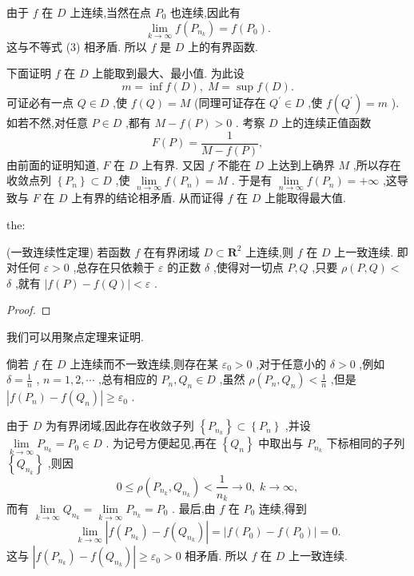 由于 \(f\) 在 \(D\) 上连续,当然在点 \({P}_{0}\) 也连续,因此有
\[
\mathop{\lim }\limits_{{k \rightarrow  \infty }}f\left( {P}_{{n}_{k}}\right)  = f\left( {P}_{0}\right) .
\]
这与不等式 (3) 相矛盾. 所以 \(f\) 是 \(D\) 上的有界函数.

下面证明 \(f\) 在 \(D\) 上能取到最大、最小值. 为此设
\[
m = \inf f\left( D\right) ,\;M = \sup f\left( D\right) .
\]
可证必有一点 \(Q \in  D\) ,使 \(f\left( Q\right)  = M\) (同理可证存在 \({Q}^{\prime } \in  D\) ,使 \(f\left( {Q}^{\prime }\right)  = m\) ). 如若不然,对任意 \(P \in  D\) ,都有 \(M - f\left( P\right)  > 0\) . 考察 \(D\) 上的连续正值函数
\[
F\left( P\right)  = \frac{1}{M - f\left( P\right) },
\]
由前面的证明知道, \(F\) 在 \(D\) 上有界. 又因 \(f\) 不能在 \(D\) 上达到上确界 \(M\) ,所以存在收敛点列 \(\left\{  {P}_{n}\right\}   \subset  D\) ,使 \(\mathop{\lim }\limits_{{n \rightarrow  \infty }}f\left( {P}_{n}\right)  = M\) . 于是有 \(\mathop{\lim }\limits_{{n \rightarrow  \infty }}f\left( {P}_{n}\right)  =  + \infty\) ,这导致与 \(F\) 在 \(D\) 上有界的结论相矛盾. 从而证得 \(f\) 在 \(D\) 上能取得最大值.

\begin{theorem}{}{the:}

\end{theorem}
(一致连续性定理) 若函数 \(f\) 在有界闭域 \(D \subset  {\mathbf{R}}^{2}\) 上连续,则 \(f\) 在 \(D\) 上一致连续. 即对任何 \(\varepsilon  > 0\) ,总存在只依赖于 \(\varepsilon\) 的正数 \(\delta\) ,使得对一切点 \(P,Q\) ,只要 \(\rho \left( {P,Q}\right)  <\)  \(\delta\) ,就有 \(\left| {f\left( P\right)  - f\left( Q\right) }\right|  < \varepsilon\) .

\begin{proof}

\end{proof}
我们可以用聚点定理来证明.

倘若 \(f\) 在 \(D\) 上连续而不一致连续,则存在某 \({\varepsilon }_{0} > 0\) ,对于任意小的 \(\delta  > 0\) ,例如 \(\delta  = \frac{1}{n}\) , \(n = 1,2,\cdots\) ,总有相应的 \({P}_{n},{Q}_{n} \in  D\) ,虽然 \(\rho \left( {{P}_{n},{Q}_{n}}\right)  < \frac{1}{n}\) ,但是 \(\left| {f\left( {P}_{n}\right)  - f\left( {Q}_{n}\right) }\right|  \geq  {\varepsilon }_{0}\) .

由于 \(D\) 为有界闭域,因此存在收敛子列 \(\left\{  {P}_{{n}_{k}}\right\}   \subset  \left\{  {P}_{n}\right\}\) ,并设 \(\mathop{\lim }\limits_{{k \rightarrow  \infty }}{P}_{{n}_{k}} = {P}_{0} \in  D\) . 为记号方便起见,再在 \(\left\{  {Q}_{n}\right\}\) 中取出与 \({P}_{{n}_{k}}\) 下标相同的子列 \(\left\{  {Q}_{{n}_{k}}\right\}\) ,则因
\[
0 \leq  \rho \left( {{P}_{{n}_{k}},{Q}_{{n}_{k}}}\right)  < \frac{1}{{n}_{k}} \rightarrow  0,\;k \rightarrow  \infty ,
\]
而有 \(\mathop{\lim }\limits_{{k \rightarrow  \infty }}{Q}_{{n}_{k}} = \mathop{\lim }\limits_{{k \rightarrow  \infty }}{P}_{{n}_{k}} = {P}_{0}\) . 最后,由 \(f\) 在 \({P}_{0}\) 连续,得到
\[
\mathop{\lim }\limits_{{k \rightarrow  \infty }}\left| {f\left( {P}_{{n}_{k}}\right)  - f\left( {Q}_{{n}_{k}}\right) }\right|  = \left| {f\left( {P}_{0}\right)  - f\left( {P}_{0}\right) }\right|  = 0.
\]
这与 \(\left| {f\left( {P}_{{n}_{k}}\right)  - f\left( {Q}_{{n}_{k}}\right) }\right|  \geq  {\varepsilon }_{0} > 0\) 相矛盾. 所以 \(f\) 在 \(D\) 上一致连续.


